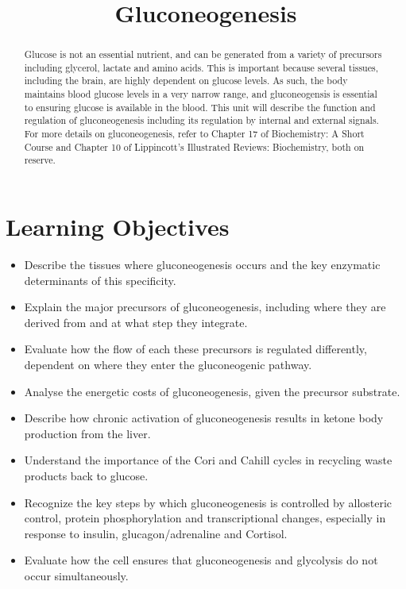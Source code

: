 \documentclass{tufte-handout}
\title{Gluconeogenesis}
\author{}
\date{}  %
\begin{document}
\maketitle%

\begin{abstract}
\noindent Glucose is not an essential nutrient, and can be generated from a variety of precursors including glycerol, lactate and amino acids.  This is important because several tissues, including the brain, are highly dependent on glucose levels.  As such, the body maintains blood glucose levels in a very narrow range, and gluconeogensis is essential to ensuring glucose is available in the blood.  This unit will describe the function and regulation of gluconeogenesis including its regulation by internal and external signals.  For more details on gluconeogenesis, refer to Chapter 17 of Biochemistry: A Short Course\cite{Berg2015} and Chapter 10 of Lippincott's Illustrated Reviews: Biochemistry\cite{Ferrier2017}, both on reserve.
\end{abstract}

\tableofcontents
\pagebreak
\section{Learning Objectives}

\begin{itemize}
\item Describe the tissues where gluconeogenesis occurs and the key enzymatic determinants of this specificity.
\item Explain the major precursors of gluconeogenesis, including where they are derived from and at what step they integrate.
\item Evaluate how the flow of each these precursors is regulated differently, dependent on where they enter the gluconeogenic pathway.
\item Analyse the energetic costs of gluconeogenesis, given the precursor substrate.
\item Describe how chronic activation of gluconeogenesis results in ketone body production from the liver.
\item Understand the importance of the Cori and Cahill cycles in recycling waste products back to glucose.
\item Recognize the key steps by which gluconeogenesis is controlled by allosteric control, protein phosphorylation and transcriptional changes, especially in response to insulin, glucagon/adrenaline and Cortisol.
\item Evaluate how the cell ensures that gluconeogenesis and glycolysis do not occur simultaneously.
\end{itemize}
\end{document}
